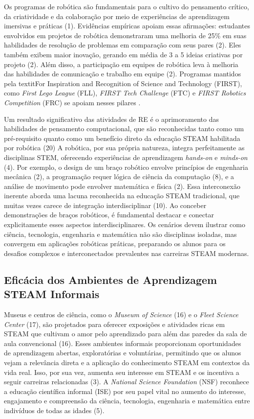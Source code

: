 \documentclass[%
  a4paper,%
  12pt,%
  fleqn,%
  english,%
  brazilian,%
]{article}
\begin{document}
Os programas de robótica são fundamentais para o cultivo do pensamento crítico, da criatividade e da colaboração por meio de experiências de aprendizagem imersivas e práticas (1). Evidências empíricas apoiam essas afirmações: estudantes envolvidos em projetos de robótica demonstraram uma melhoria de 25\% em suas habilidades de resolução de problemas em comparação com seus pares (2). Eles também exibem maior inovação, gerando em média de 3 a 5 ideias criativas por projeto (2). Além disso, a participação em equipes de robótica leva à melhoria das habilidades de comunicação e trabalho em equipe (2). Programas mantidos pela textit{For Inspiration and Recognition of Science and Technology} (FIRST), como \textit{First Lego League} (FLL), \textit{FIRST Tech Challenge} (FTC) e \textit{FIRST Robotics Competition} (FRC) se apoiam nesses pilares \cite{firstRobotics2025}.

Um resultado significativo das atividades de RE é o aprimoramento das habilidades de pensamento computacional, que são reconhecidas tanto como um pré-requisito quanto como um benefício direto da educação STEAM habilitada por robótica (20) A robótica, por sua própria natureza, integra perfeitamente as disciplinas STEM, oferecendo experiências de aprendizagem \emph{hands-on} e \emph{minds-on} (4). Por exemplo, o design de um braço robótico envolve princípios de engenharia mecânica (2), a programação requer lógica de ciência da computação (8), e a análise de movimento pode envolver matemática e física (2). Essa interconexão inerente aborda uma lacuna reconhecida na educação STEAM tradicional, que muitas vezes carece de integração interdisciplinar (10). Ao conceber demonstrações de braços robóticos, é fundamental destacar e conectar explicitamente esses aspectos interdisciplinares. Os cenários devem ilustrar como ciência, tecnologia, engenharia e matemática não são disciplinas isoladas, mas convergem em aplicações robóticas práticas, preparando os alunos para os desafios complexos e interconectados prevalentes nas carreiras STEAM modernas.

\subsection{Eficácia dos Ambientes de Aprendizagem STEAM Informais}
Museus e centros de ciência, como o \textit{Museum of Science} (16) e o \textit{Fleet Science Center} (17), são projetados para oferecer exposições e atividades ricas em STEAM que cultivam o amor pelo aprendizado para além das paredes da sala de aula convencional (16). Esses ambientes informais proporcionam oportunidades de aprendizagem abertas, exploratórias e voluntárias, permitindo que os alunos vejam a relevância direta e a aplicação do conhecimento STEAM em contextos da vida real. Isso, por sua vez, aumenta seu interesse em STEAM e os incentiva a seguir carreiras relacionadas (3). A \textit{National Science Foundation} (NSF) reconhece a educação científica informal (ISE) por seu papel vital no aumento do interesse, engajamento e compreensão da ciência, tecnologia, engenharia e matemática entre indivíduos de todas as idades (5).
\end{document}
